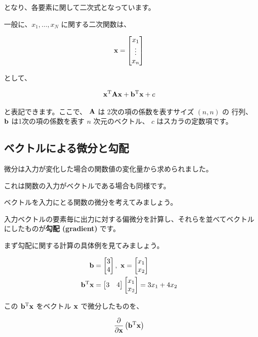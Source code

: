 となり、各要素に関して二次式となっています。

一般に、$x_1, \ldots, x_N$ に関する二次関数は、


\[
{\bf x} = \begin{bmatrix}
x_1 \\
\vdots \\
x_n \\
\end{bmatrix}
\]


として、


\[
{\bf x}^{\rm T}{\bf A}{\bf x} + {\bf b}^{\rm T}{\bf x} + c
\]


と表記できます。ここで、 ${\bf A}$ は 2次の項の係数を表すサイズ $(n, n)$ の 行列、 ${\bf b}$ は1次の項の係数を表す $n$ 次元のベクトル、 $c$ はスカラの定数項です。


\subsection{ベクトルによる微分と勾配}


微分は入力が変化した場合の関数値の変化量から求められました。

これは関数の入力がベクトルである場合も同様です。

ベクトルを入力にとる関数の微分を考えてみましょう。

入力ベクトルの要素毎に出力に対する偏微分を計算し、それらを並べてベクトルにしたものが\textbf{勾配 (gradient)} です。


まず勾配に関する計算の具体例を見てみましょう。


\[
\begin{aligned}
{\bf b}
&=\begin{bmatrix}
3 \\
4
\end{bmatrix}, \
{\bf x} =
\begin{bmatrix}
x_{1} \\
x_{2}
\end{bmatrix}\\
{\bf b}^{\rm T}{\bf x} &=
\begin{bmatrix}
3 & 4
\end{bmatrix}
\begin{bmatrix}
x_1 \\
x_2
\end{bmatrix}
= 3x_1 + 4x_2
\end{aligned}
\]


この ${\bf b}^{\rm T}{\bf x}$ をベクトル ${\bf x}$ で微分したものを、


\[
\frac{\partial}{\partial {\bf x}} \left( {\bf b}^{\rm T}{\bf x} \right)
\]


